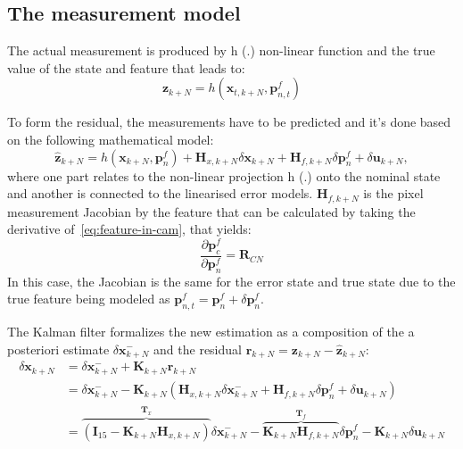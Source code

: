 \subsection{The measurement model}

The actual measurement is produced by h (.) non-linear function and the true value of the state and feature that leads to:
\begin{equation}
    \mathbf{z}_{k+N} = h(\mathbf{x}_{t,k+N},\mathbf{p}_{n,t}^f)
\end{equation}

To form the residual, the measurements have to be predicted and it's done based on the following mathematical model:
\begin{equation}
    \hat{\mathbf{z}}_{k+N} = h(\mathbf{x}_{k+N},\mathbf{p}_{n}^f) + \mathbf{H}_{x,k+N}\delta\mathbf{x}_{k+N}+\mathbf{H}_{f, k+N}\delta\mathbf{p}_{n}^f + \delta\mathbf{u}_{k+N}, 
\end{equation}
where one part relates to the non-linear projection h (.) onto the nominal state and another is connected to the linearised error models. $\mathbf{H}_{f,k+N}$ is the pixel measurement Jacobian by the feature that can be calculated by taking the derivative of~\eqref{eq:feature-in-cam}, that yields:
\begin{equation}
    \frac{\partial\mathbf{p}_c^f}{\partial\mathbf{p}_n^f}=\mathbf{R}_{CN}
\end{equation}
In this case, the Jacobian is the same for the error state and true state due to the true feature being modeled as $\mathbf{p}_{n,t}^f=\mathbf{p}_n^f+\delta\mathbf{p}_n^f$.

The Kalman filter formalizes the new estimation as a composition of the a posteriori estimate $\delta\mathbf{x}_{k+N}^-$ and the residual $\mathbf{r}_{k+N}=\mathbf{z}_{k+N}-\hat{\mathbf{z}}_{k+N}$:
\begin{equation}
\begin{aligned}
    \delta\mathbf{x}_{k+N} &= \delta\mathbf{x}_{k+N}^-+\mathbf{K}_{k+N}\mathbf{r}_{k+N} \\ &=
    \delta\mathbf{x}_{k+N}^--\mathbf{K}_{k+N}(\mathbf{H}_{x,k+N}\delta\mathbf{x}_{k+N}^-+\mathbf{H}_{f, k+N}\delta\mathbf{p}_{n}^f + \delta\mathbf{u}_{k+N}) \\ &=
    \overbrace{\left(\mathbf{I}_{15}-\mathbf{K}_{k+N}\mathbf{H}_{x,k+N}\right)}^{\mathbf{T}_x}\delta\mathbf{x}_{k+N}^--\overbrace{\mathbf{K}_{k+N}\mathbf{H}_{f,k+N}}^{\mathbf{T}_f}\delta\mathbf{p}_n^f - \mathbf{K}_{k+N}\delta\mathbf{u}_{k+N}
    \label{eq:pred-err-state}
\end{aligned}
\end{equation}

